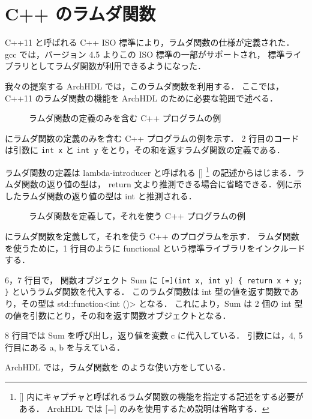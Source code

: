 \section{C++ のラムダ関数}

C++11 と呼ばれる C++ ISO 標準により，ラムダ関数の仕様が定義された． gcc
では，バージョン 4.5 よりこの ISO 標準の一部がサポートされ，
標準ライブラリとしてラムダ関数が利用できるようになった．

我々の提案する ArchHDL では，このラムダ関数を利用する． ここでは，C++11
のラムダ関数の機能を ArchHDL のために必要な範囲で述べる．

\begin{figure}[t]
 
 \caption{ラムダ関数の定義のみを含む C++ プログラムの例}
 \label{src:def_lambda}
\end{figure}

 にラムダ関数の定義のみを含む C++
プログラムの例を示す． 2 行目のコードは引数に \verb`int x` と
\verb`int y` をとり，その和を返すラムダ関数の定義である．

ラムダ関数の定義は lambda-introducer と呼ばれる {[}{]} \footnote{
[] 内にキャプチャと呼ばれるラムダ関数の機能を指定する記述をする必要がある．
ArchHDL では [=] のみを使用するため説明は省略する．
} の記述からはじまる．ラムダ関数の返り値の型は， return
文より推測できる場合に省略できる．例に示したラムダ関数の返り値の型は int
と推測される．

\begin{figure}[t]
 
 \caption{ラムダ関数を定義して，それを使う C++ プログラムの例}
 \label{src:ex_lambda}
\end{figure}

 にラムダ関数を定義して，それを使う C++
のプログラムを示す． ラムダ関数を使うために，1 行目のように functional
という標準ライブラリをインクルードする．

6，7 行目で， 関数オブジェクト Sum に
\verb`[=](int x, int y) { return x + y; }` というラムダ関数を代入する．
このラムダ関数は int 型の値を返す関数であり，その型は
std::function\textless{}int ()\textgreater{} となる． これにより，Sum は
2 個の int 型の値を引数にとり，その和を返す関数オブジェクトとなる．

8 行目では Sum を呼び出し，返り値を変数 c に代入している． 引数には，4,
5 行目にある a, b を与えている．

ArchHDL では，ラムダ関数を 
のような使い方をしている．

